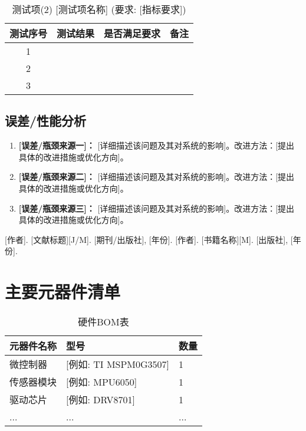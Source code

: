 \documentclass[UTF-8,zihao=-4]{ctexart}
\begin{document}
    \begin{table}[H]
        \centering
        \caption{测试项(2) [测试项名称] (要求: [指标要求])}
        \label{tab:task2}
        \begin{tabular}{cccc}
            \toprule
            测试序号 & 测试结果 & 是否满足要求 & 备注 \\
            \midrule
            1 & & & \\
            2 & & & \\
            3 & & & \\
            \bottomrule
        \end{tabular}
    \end{table}
    

\subsection{误差/性能分析}
    \begin{enumerate}
        \item \textbf{[误差/瓶颈来源一]：} [详细描述该问题及其对系统的影响]。改进方法：[提出具体的改进措施或优化方向]。
        \item \textbf{[误差/瓶颈来源二]：} [详细描述该问题及其对系统的影响]。改进方法：[提出具体的改进措施或优化方向]。
        \item \textbf{[误差/瓶颈来源三]：} [详细描述该问题及其对系统的影响]。改进方法：[提出具体的改进措施或优化方向]。
    \end{enumerate}

\begin{thebibliography}{99}
     [作者]. [文献标题][J/M]. [期刊/出版社], [年份].
     [作者]. [书籍名称][M]. [出版社], [年份].
\end{thebibliography}

\appendix
\section{主要元器件清单}
\begin{table}[H]
    \centering
    \caption{硬件BOM表}
    \label{tab:bom}
    \begin{tabular}{lll}
        \toprule
        元器件名称 & 型号 & 数量 \\
        \midrule
        微控制器 & [例如: TI MSPM0G3507] & 1 \\
        传感器模块 & [例如: MPU6050] & 1 \\
        驱动芯片 & [例如: DRV8701] & 1 \\
        ... & ... & ... \\ %
        \bottomrule
    \end{tabular}
\end{table}
\end{document}
